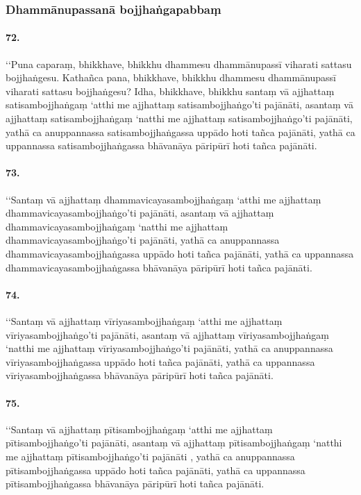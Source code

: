 
\subsubsection{Dhammānupassanā bojjhaṅgapabbaṃ}

\paragraph{72.} ‘‘Puna caparaṃ, bhikkhave, bhikkhu dhammesu dhammānupassī viharati sattasu bojjhaṅgesu. Kathañca pana, bhikkhave, bhikkhu dhammesu dhammānupassī viharati sattasu bojjhaṅgesu? Idha, bhikkhave, bhikkhu santaṃ vā ajjhattaṃ satisambojjhaṅgaṃ ‘atthi me ajjhattaṃ satisambojjhaṅgo’ti pajānāti, asantaṃ vā ajjhattaṃ satisambojjhaṅgaṃ ‘natthi me ajjhattaṃ satisambojjhaṅgo’ti pajānāti, yathā ca anuppannassa satisambojjhaṅgassa uppādo hoti tañca pajānāti, yathā ca uppannassa satisambojjhaṅgassa bhāvanāya pāripūrī hoti tañca pajānāti.

\paragraph{73.} ‘‘Santaṃ vā ajjhattaṃ dhammavicayasambojjhaṅgaṃ ‘atthi me ajjhattaṃ dhammavicayasambojjhaṅgo’ti pajānāti, asantaṃ vā ajjhattaṃ dhammavicayasambojjhaṅgaṃ ‘natthi me ajjhattaṃ dhammavicayasambojjhaṅgo’ti pajānāti, yathā ca anuppannassa dhammavicayasambojjhaṅgassa uppādo hoti tañca pajānāti, yathā ca uppannassa dhammavicayasambojjhaṅgassa bhāvanāya pāripūrī hoti tañca pajānāti.

\paragraph{74.} ‘‘Santaṃ vā ajjhattaṃ vīriyasambojjhaṅgaṃ ‘atthi me ajjhattaṃ vīriyasambojjhaṅgo’ti pajānāti, asantaṃ vā ajjhattaṃ vīriyasambojjhaṅgaṃ ‘natthi me ajjhattaṃ vīriyasambojjhaṅgo’ti pajānāti, yathā ca anuppannassa vīriyasambojjhaṅgassa uppādo hoti tañca pajānāti, yathā ca uppannassa vīriyasambojjhaṅgassa bhāvanāya pāripūrī hoti tañca pajānāti.

\paragraph{75.} ‘‘Santaṃ vā ajjhattaṃ pītisambojjhaṅgaṃ ‘atthi me ajjhattaṃ pītisambojjhaṅgo’ti pajānāti, asantaṃ vā ajjhattaṃ pītisambojjhaṅgaṃ ‘natthi me ajjhattaṃ pītisambojjhaṅgo’ti pajānāti , yathā ca anuppannassa pītisambojjhaṅgassa uppādo hoti tañca pajānāti, yathā ca uppannassa pītisambojjhaṅgassa bhāvanāya pāripūrī hoti tañca pajānāti.

